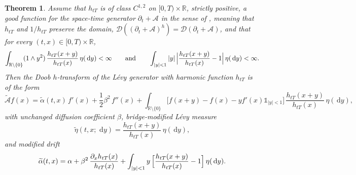 \documentclass{article}
\newtheorem{thm}{Theorem}[section]
\newcommand{\levy}{{L\'evy }}
\def\1{\mathds{1}}
\def\R{\mathbb{R}}
\def\d{\,\mathrm{d}}
\def\half{\frac{1}{2}}
\theoremstyle{definition}
\begin{document}
\begin{thm}
\label{thm:modified-levy-app}
Assume that $h_{tT}$ is of class $C^{1,2}$ on $[0,T) \times \R$, strictly positive, a good function for the space-time generator $\partial_t + \mathcal{A}$ in the sense of \cite[Section~4]{PalmowskiRolski2002}, meaning that $h_{tT}$ and $1/h_{tT}$ preserve the domain, $\mathcal{D}((\partial_t + \mathcal{A})^{h}) = \mathcal{D}(\partial_t + \mathcal{A})$, and that for every $(t,x) \in [0,T) \times \R$,
\begin{equation}\label{eq:levy-kernel-condition}
  \int_{\R\setminus\{0\}} (1 \wedge y^2)\,\frac{h_{tT}(x+y)}{h_{tT}(x)}\,\eta(\d y) < \infty
  \qquad \text{and} \qquad
  \int_{|y|<1} |y|\,\Bigl|\frac{h_{tT}(x+y)}{h_{tT}(x)} - 1\Bigr|\,\eta(\d y) < \infty.
\end{equation}
Then the Doob $h$-transform of the \levy generator with harmonic function $h_{tT}$ is of the form
\begin{equation}\label{eq:modified-generator-app}
  \widetilde{\mathcal{A}}f(x)
  = \widetilde{\alpha}(t,x)\,f'(x)
    + \half\beta^2\,f''(x)
    + \int_{\R\setminus\{0\}}\bigl[f(x+y) - f(x) - yf'(x)\1_{|y|<1}\bigr]\,
      \frac{h_{tT}(x+y)}{h_{tT}(x)}\,\eta(\d y),
\end{equation}
with unchanged diffusion coefficient $\beta$, bridge-modified \levy measure
\begin{equation}\label{eq:modified-levy-measure-app}
  \widetilde{\eta}(t, x;\, \d y)
  = \frac{h_{tT}(x+y)}{h_{tT}(x)}\,\eta(\d y),
\end{equation}
and modified drift
\begin{equation}\label{eq:modified-drift-app}
  \widetilde{\alpha}(t,x)
  = \alpha
    + \beta^2\,\frac{\partial_x h_{tT}(x)}{h_{tT}(x)}
    + \int_{|y|<1} y\,\Bigl[\frac{h_{tT}(x+y)}{h_{tT}(x)} - 1\Bigr]\,\eta(\d y).
\end{equation}
\end{thm}
\end{document}

